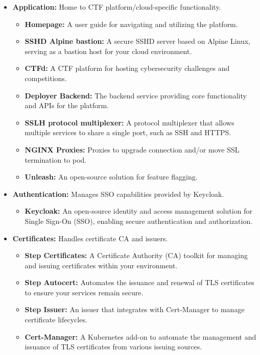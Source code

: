 \begin{itemize}
    \item \textbf{Application:} Home to CTF platform/cloud-specific functionality.
    \begin{itemize}
        \item \textbf{Homepage:} A user guide for navigating and utilizing the platform.
        \item \textbf{SSHD Alpine bastion:} A secure SSHD server based on Alpine Linux, serving as a bastion host for your cloud environment.
        \item \textbf{CTFd:} A CTF platform for hosting cybersecurity challenges and competitions.
        \item \textbf{Deployer Backend:} The backend service providing core functionality and APIs for the platform.
        \item \textbf{SSLH protocol multiplexer:} A protocol multiplexer that allows multiple services to share a single port, such as SSH and HTTPS.
        \item \textbf{NGINX Proxies:} Proxies to upgrade connection and/or move SSL termination to pod.
        \item \textbf{Unleash:} An open-source solution for feature flagging.
    \end{itemize}
    \item \textbf{Authentication:} Manages SSO capabilities provided by Keycloak.
    \begin{itemize}
        \item \textbf{Keycloak:} An open-source identity and access management solution for Single Sign-On (SSO), enabling secure authentication and authorization.
    \end{itemize}
    \item \textbf{Certificates:} Handles certificate CA and issuers.
    \begin{itemize}
        \item \textbf{Step Certificates:} A Certificate Authority (CA) toolkit for managing and issuing certificates within your environment.
        \item \textbf{Step Autocert:} Automates the issuance and renewal of TLS certificates to ensure your services remain secure.
        \item \textbf{Step Issuer:} An issuer that integrates with Cert-Manager to manage certificate lifecycles.
        \item \textbf{Cert-Manager:} A Kubernetes add-on to automate the management and issuance of TLS certificates from various issuing sources.

\end{itemize}
\end{itemize}
